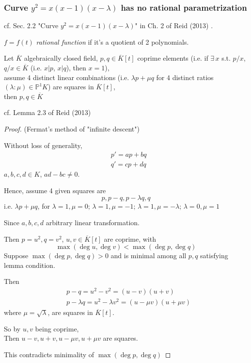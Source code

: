 \subsubsection{Curve $y^2 = x(x-1)(x-\lambda )$ has no rational parametrization}

cf. Sec. 2.2 "Curve $y^2 = x(x-1)(x-\lambda)$" in Ch. 2 of Reid (2013) \cite{agat:Reid2013}.

$f = f(t)$ \emph{rational function} if it's a quotient of 2 polynomials. 

\begin{lemma}\label{agat:Lem:SquaresOfCoprimesAreConstant}
	Let $\overline{K}$ algebraically closed field, $p, q \in \overline{K}[t]$ coprime elements (i.e. if $\exists \, x $ s.t. $p/x$, $q/x \in \overline{K}$ (i.e. $x | p$, $x | q$), then $x=1$), \\
	assume 4 distinct linear combinations (i.e. $\lambda p + \mu q$ for 4 distinct ratios $(\lambda : \mu) \in \mathbb{P}^1K$) are squares in $\overline{K}[t]$, \\ 
	then $p,q \in \overline{K}$
\end{lemma}

cf. Lemma 2.3 of Reid (2013) \cite{agat:Reid2013}

\begin{proof}
	(Fermat's method of "infinite descent")
	
	Without loss of generality, 
	\[
	\begin{aligned}
		& p' = ap + bq \\ 
		& q' = cp + dq
	\end{aligned}
	\]
	$a,b,c, d \in K$, $ad-bc \neq 0$. 
	
	Hence, assume 4 given squares are 
	\[
	p, p-q, p-\lambda q , q
	\]
	i.e. $\lambda p + \mu q$, for $\lambda = 1, \mu = 0$; $\lambda = 1, \mu = -1$; $\lambda = 1, \mu = -\lambda$; $\lambda = 0, \mu = 1$
	
	Since $a,b,c,d$ arbitrary linear transformation.
	
	Then $p = u^2, q = v^2$, $u,v \in \overline{K}[t]$ are coprime, with 
	\[
	\max{ (\deg{u} , \deg{v} )} < \max{ (\deg{p}, \deg{q})}
	\]
	Suppose $\max{(\deg{p}, \deg{q})} >0$ and is minimal among all $p,q$ satisfying lemma condition.
	
	Then 
	\[
	\begin{aligned}
	& p - q = u^2 - v^2 = (u-v)(u+v) \\
	& p - \lambda q = u^2 - \lambda v^2 = (u-\mu v) (u + \mu v)
	\end{aligned}
	\]
	where $\mu = \sqrt{\lambda}$, are squares in $\overline{K}[t]$. 
	
	So by $u,v $ being coprime, \\
	\phantom{ \qquad \, } Then $u-v, u+v, u- \mu v, u + \mu v$ are squares.
	
	This contradicts minimality of $\max{(\deg{p}, \deg{q})}$


\end{proof}	





